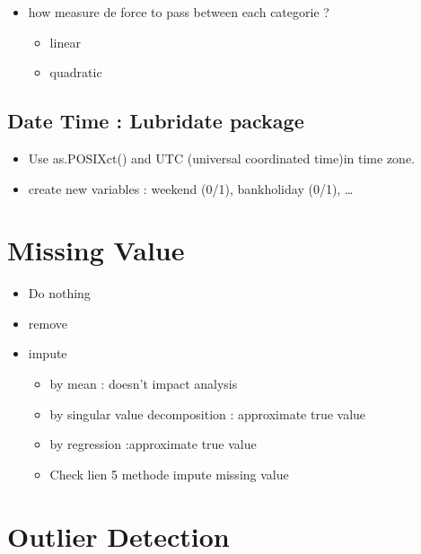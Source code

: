 \documentclass[]{book}
\providecommand{\tightlist}{%
  \setlength{\itemsep}{0pt}\setlength{\parskip}{0pt}}
\theoremstyle{definition}
\theoremstyle{definition}
\theoremstyle{definition}
\theoremstyle{remark}
\begin{document}
\begin{itemize}
  \begin{itemize}
  \tightlist
  \item
    how measure de force to pass between each categorie ?

    \begin{itemize}
    \tightlist
    \item
      linear
    \item
      quadratic
    \end{itemize}
  \end{itemize}
\end{itemize}

\subsection{Date Time : Lubridate
package}\label{date-time-lubridate-package}

\begin{itemize}
\tightlist
\item
  Use as.POSIXct() and UTC (universal coordinated time)in time zone.
\item
  create new variables : weekend (0/1), bankholiday (0/1), \ldots{}
\end{itemize}

\section{Missing Value}\label{missing-value}

\begin{itemize}
\tightlist
\item
  Do nothing
\item
  remove
\item
  impute

  \begin{itemize}
  \tightlist
  \item
    by mean : doesn't impact analysis
  \item
    by singular value decomposition : approximate true value
  \item
    by regression :approximate true value
  \item
    Check lien 5 methode impute missing value
  \end{itemize}
\end{itemize}

\section{Outlier Detection}\label{outlier-detection}
\end{document}
